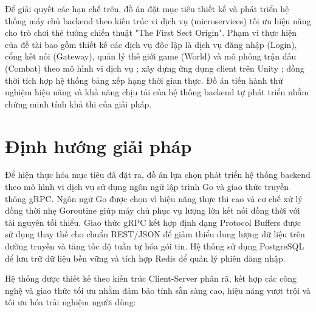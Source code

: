 \documentclass[../Project.tex]{subfiles}
\begin{document}
Để giải quyết các hạn chế trên, đồ án đặt mục tiêu thiết kế và phát triển hệ thống máy chủ backend theo kiến trúc vi dịch vụ (microservices) tối ưu hiệu năng cho trò chơi thẻ tướng chiến thuật "The First Sect Origin". Phạm vi thực hiện của đề tài bao gồm thiết kế các dịch vụ độc lập là dịch vụ đăng nhập (Login), cổng kết nối (Gateway), quản lý thế giới game (World) và mô phỏng trận đấu (Combat) theo mô hình vi dịch vụ \cite{newman2021building}; xây dựng ứng dụng client trên Unity \cite{unity2026}; đồng thời tích hợp hệ thống bảng xếp hạng thời gian thực. Đồ án tiến hành thử nghiệm hiệu năng và khả năng chịu tải của hệ thống backend tự phát triển nhằm chứng minh tính khả thi của giải pháp.

\section{Định hướng giải pháp}
Để hiện thực hóa mục tiêu đã đặt ra, đồ án lựa chọn phát triển hệ thống backend theo mô hình vi dịch vụ sử dụng ngôn ngữ lập trình Go và giao thức truyền thông gRPC. Ngôn ngữ Go \cite{donovan2015go} được chọn vì hiệu năng thực thi cao và cơ chế xử lý đồng thời nhẹ Goroutine giúp máy chủ phục vụ lượng lớn kết nối đồng thời với tài nguyên tối thiểu. Giao thức gRPC \cite{indrasiri2020grpc} kết hợp định dạng Protocol Buffers được sử dụng thay thế cho chuẩn REST/JSON để giảm thiểu dung lượng dữ liệu trên đường truyền và tăng tốc độ tuần tự hóa gói tin. Hệ thống sử dụng PostgreSQL \cite{postgresql2026} để lưu trữ dữ liệu bền vững và tích hợp Redis \cite{carlson2013redis} để quản lý phiên đăng nhập.

Hệ thống được thiết kế theo kiến trúc Client-Server phân rã, kết hợp các công nghệ và giao thức tối ưu nhằm đảm bảo tính sẵn sàng cao, hiệu năng vượt trội và tối ưu hóa trải nghiệm người dùng:
\end{document}
